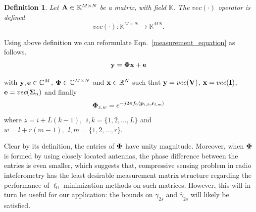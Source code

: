 \documentclass{article}
\newtheorem{definition}{Definition}
\begin{document}
\begin{definition}
Let ${\bf A} \in \mathbb{K}^{M\times N}$ be a matrix, with field ${\mathbb{K}}$. The $vec(\cdot)$ operator is defined
\begin{equation*}
    {vec(\cdot)}: \mathbb{K}^{M\times N} \rightarrow \mathbb{K}^{MN}.
\end{equation*}
\end{definition}

Using above definition we can reformulate Eqn.~\ref{measurement_equation} as follows.
\begin{equation}
    {\bf y} = {\bf \Phi}{\bf x} + {\bf e}
\end{equation}

with ${\bf y}, {\bf e} \in \mathbb{C}^{M}$, ${\bf \Phi} \in \mathbb{C}^{M\times N}$ and ${\bf x} \in \mathbb{R}^{N}$ such that ${\bf y} = vec({\bf V})$, ${\bf x} = vec({\bf I})$, ${\bf e} = vec(\boldsymbol{\Sigma}_n)$ and finally
\begin{equation}
    {\bf \Phi}_{z,w} = e^{-j2\pi f_0 \langle {\bf p}_{i, k}, {\bf r}_{l, m} \rangle } 
\end{equation}
where $z = i + L(k-1), \ \ i, k = \{1, 2, ..., L\}$ and $w = l + r(m-1), \ \ l, m = \{1, 2, ..., r\}$.

Clear by its definition, the entries of ${\bf \Phi}$ have unity magnitude. Moreover, when ${\bf \Phi}$ is formed by using closely located antennas, the phase difference between the entries is even smaller, which suggests that, compressive sensing problem in radio inteferometry has the least desirable measurement matrix structure regarding the performance of $\ell_0$-minimization methods on such matrices. However, this will in turn be useful for our application: the bounds on $\gamma_{2s}$ and $\hat{\gamma}_{2s}$ will likely be satisfied.
\end{document}
